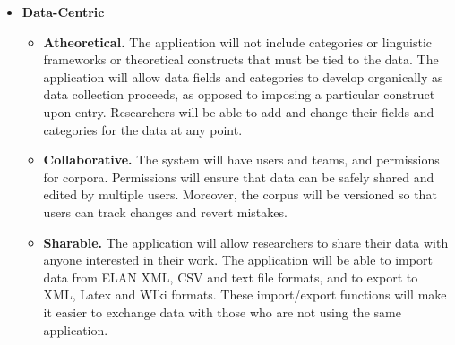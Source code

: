 \documentclass[12 pt]{article}
\begin{document}
\begin{itemize}
\item{\bf Data-Centric}
\begin{itemize}
\item {\bf Atheoretical.} The application will not include categories or linguistic frameworks or theoretical constructs that must be tied to the data.  The application will allow data fields and categories to develop organically as data collection proceeds, as opposed to imposing a particular construct upon entry.  Researchers will be able to add and change their fields and categories for the data at any point.
\item {\bf Collaborative.} The system will have users and teams, and permissions for corpora. Permissions will ensure that data can be safely shared and edited by multiple users. Moreover, the corpus will be versioned so that users can track changes and revert mistakes.
\item {\bf Sharable.} The application will allow researchers to share their data with anyone interested in their work. The application will be able to import data from ELAN XML, CSV and text file formats, and to export to XML, Latex and WIki formats. These import/export functions will make it easier to exchange data with those who are not using the same application. 
\end{itemize}



\end{itemize}
\end{document}
